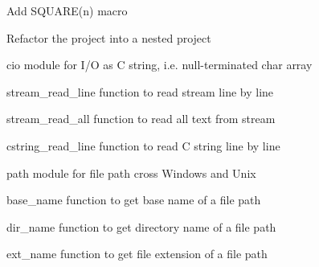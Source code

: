
\begin{DoxyItemize}
\item Add {\ttfamily S\-Q\-U\-A\-R\-E(n)} macro
\item Refactor the project into a nested project
\item {\ttfamily cio} module for I/\-O as C string, i.\-e. null-\/terminated {\ttfamily char} array
\begin{DoxyItemize}
\item {\ttfamily stream\-\_\-read\-\_\-line} function to read stream line by line
\item {\ttfamily stream\-\_\-read\-\_\-all} function to read all text from stream
\item {\ttfamily cstring\-\_\-read\-\_\-line} function to read C string line by line
\end{DoxyItemize}
\item {\ttfamily path} module for file path cross Windows and Unix
\begin{DoxyItemize}
\item {\ttfamily base\-\_\-name} function to get base name of a file path
\item {\ttfamily dir\-\_\-name} function to get directory name of a file path
\item {\ttfamily ext\-\_\-name} function to get file extension of a file path 
\end{DoxyItemize}
\end{DoxyItemize}